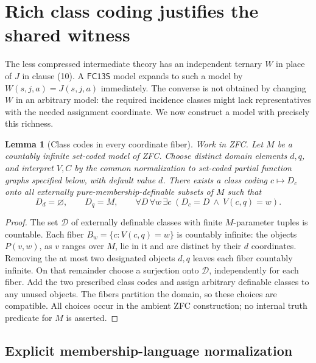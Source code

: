 \documentclass[11pt]{article}
\newtheorem{lemma}[theorem]{Lemma}
\newcommand{\FC}{\ensuremath{\mathsf{FC13S}}}
\begin{document}
\section{Rich class coding justifies the shared witness}

The less compressed intermediate theory has an independent ternary $W$
in place of $J$ in clause (10).  A $\FC$ model expands to such a model by
$W(s,j,a)=J(s,j,a)$ immediately.  The converse is not obtained by changing
$W$ in an arbitrary model: the required incidence classes might lack
representatives with the needed assignment coordinate.  We now construct
a model with precisely this richness.

\begin{lemma}[Class codes in every coordinate fiber]
Work in ZFC.  Let $M$ be a countably infinite set-coded model of ZFC.
Choose distinct domain elements $d,q$, and interpret $V,C$ by the common
normalization to set-coded partial function graphs specified below, with
default value $d$.  There exists a class coding $c\mapsto D_c$ onto all externally
pure-membership-definable subsets of $M$ such that
\[
 D_d=\varnothing,\qquad D_q=M,\qquad
 \forall D\,\forall w\,\exists c\;(D_c=D\ \land\ V(c,q)=w).
\]
\end{lemma}
\begin{proof}
The set $\mathcal D$ of externally definable classes with finite
$M$-parameter tuples is countable.  Each fiber
$B_w=\{c:V(c,q)=w\}$ is countably infinite: the objects $P(v,w)$, as
$v$ ranges over $M$, lie in it and are distinct by their $d$ coordinates.
Removing the at most two designated objects $d,q$ leaves each fiber
countably infinite.  On that remainder choose a surjection onto
$\mathcal D$, independently for each fiber.  Add the two prescribed class
codes and assign arbitrary definable classes to any unused objects.
The fibers partition the domain, so these choices are compatible.
All choices occur in the ambient ZFC construction; no internal truth
predicate for $M$ is asserted.
\end{proof}

\subsection*{Explicit membership-language normalization}
\end{document}
